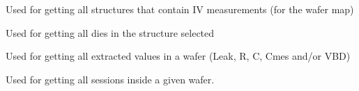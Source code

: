 \documentclass[letterpaper,10pt,english]{sphinxmanual}
\begin{document}

\begin{fulllineitems}
\label{\detokenize{app:app.get_map_structures_server}}
\pysigstartsignatures
{}
\pysigstopsignatures
\sphinxAtStartPar
Used for getting all structures that contain I\sphinxhyphen{}V measurements (for the wafer map)

\end{fulllineitems}


\begin{fulllineitems}
\label{\detokenize{app:app.get_matrices}}
\pysigstartsignatures
{}
\pysigstopsignatures
\sphinxAtStartPar
Used for getting all dies in the structure selected

\end{fulllineitems}


\begin{fulllineitems}
\label{\detokenize{app:app.get_normal_values}}
\pysigstartsignatures
{}
\pysigstopsignatures
\sphinxAtStartPar
Used for getting all extracted values in a wafer (Leak, R, C, Cmes and/or VBD)

\end{fulllineitems}


\begin{fulllineitems}
\label{\detokenize{app:app.get_sessions_server}}
\pysigstartsignatures
{}
\pysigstopsignatures
\sphinxAtStartPar
Used for getting all sessions inside a given wafer.

\end{fulllineitems}
\end{document}
